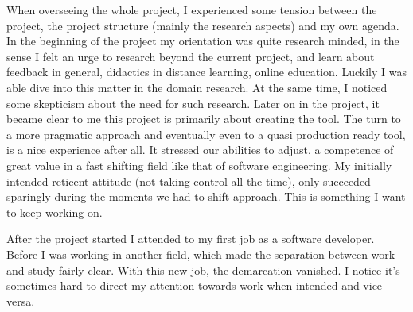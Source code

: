 When overseeing the whole project, I experienced some tension between the
project, the project structure (mainly the research aspects) and my own agenda.
In the beginning of the project my orientation was quite research minded, in the
sense I felt an urge to research beyond the current project, and learn about 
feedback in general, didactics in distance learning, online education. Luckily
I was able dive into this matter in the domain research. At the same time, I
noticed some skepticism about the need for such research. Later on in the 
project, it became clear to me this project is primarily about creating the 
tool. The turn to a more pragmatic approach and eventually even to a quasi 
production ready tool, is a nice experience after all. It stressed our 
abilities to adjust, a competence of great value in a fast shifting field like 
that of software engineering. My initially intended reticent attitude (not taking control all the time), only succeeded sparingly during the moments we had to shift approach. This is something I want to keep working on.

After the project started I attended to my first job as a software developer. 
Before I was working in another field, which made the separation between work 
and study fairly clear. With this new job, the demarcation vanished. I notice 
it's sometimes hard to direct my attention towards work when intended and vice 
versa. 


